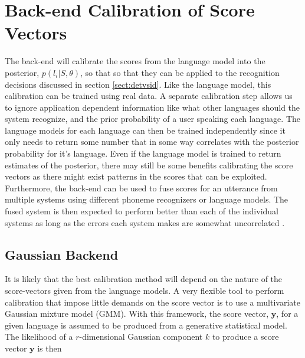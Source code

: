 \section{Back-end Calibration of Score Vectors}
\label{sect:backendscoring}

The back-end will calibrate the scores from the language model into the posterior, $p(l_i | S, \theta)$, so that so that they can be applied to the recognition decisions discussed in section \ref{sect:detvsid}. Like the language model, this calibration can be trained using real data. A separate calibration step allows us to ignore application dependent information like what other languages should the system recognize, and the prior probability of a user speaking each language. The language models for each language can then be trained independently since it only needs to return some number that in some way correlates with the posterior probability for it's language. Even if the language model is trained to return estimates of the posterior, there may still be some benefits calibrating the score vectors \cite[820]{lidbok} as there might exist patterns in the scores that can be exploited. Furthermore, the back-end can be used to fuse scores for an utterance from multiple systems using different phoneme recognizers or language models. The fused system is then expected to perform better than each of the individual systems as long as the errors each system makes are somewhat uncorrelated \cite[818]{lidbok}.

\subsection{Gaussian Backend}

It is likely that the best calibration method will depend on the nature of the score-vectors given from the language models. A very flexible tool to perform calibration that impose little demands on the score vector is to use a multivariate Gaussian mixture model (GMM). With this framework, the score vector, $\mathbf{y}$, for a given language is assumed to be produced from a generative statistical model. The likelihood of a $r$-dimensional Gaussian component $k$ to produce a score vector $\mathbf{y}$ is then


